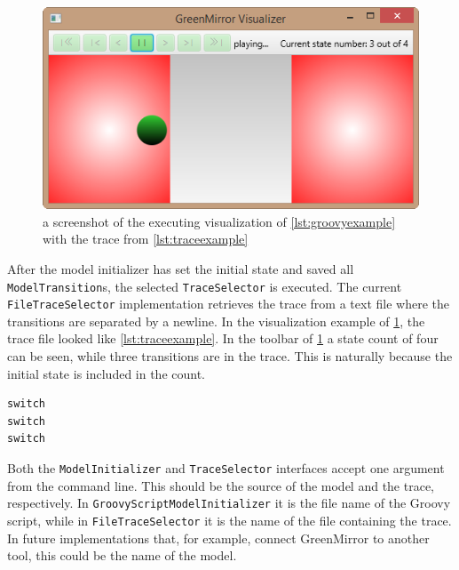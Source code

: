 \begin{figure}[H]
  \centering
  \includegraphics{images/groovyexample}
  \caption{a screenshot of the executing visualization of \cref{lst:groovyexample} with the trace from \cref{lst:traceexample}}\label{fig:groovyexample}
\end{figure}
\par After the model initializer has set the initial state and saved all \lstinline{ModelTransition}s, the selected \lstinline{TraceSelector} is executed. The current \lstinline{FileTraceSelector} implementation retrieves the trace from a text file where the transitions are separated by a newline. In the visualization example of \cref{fig:groovyexample}, the trace file looked like \cref{lst:traceexample}. In the toolbar of \cref{fig:groovyexample} a state count of four can be seen, while three transitions are in the trace. This is naturally because the initial state is included in the count.	
\begin{lstlisting}[label={lst:traceexample}, caption={example trace file for the model defined in \cref{lst:groovyexample}}]
switch
switch
switch
\end{lstlisting}
Both the \lstinline{ModelInitializer} and \lstinline{TraceSelector} interfaces accept one argument from the command line. This should be the source of the model and the trace, respectively. In \lstinline{GroovyScriptModelInitializer} it is the file name of the Groovy script, while in \lstinline{FileTraceSelector} it is the name of the file containing the trace. In future implementations that, for example, connect GreenMirror to another tool, this could be the name of the model.

